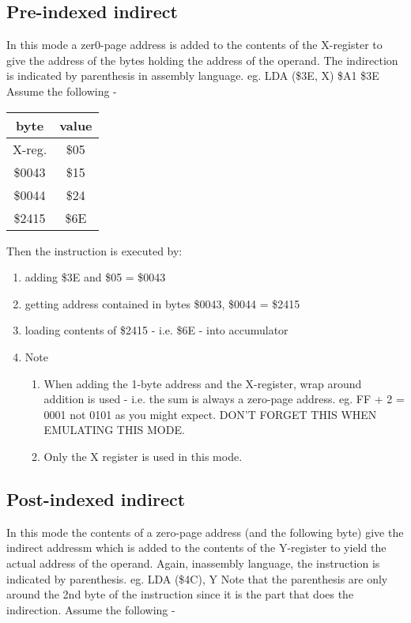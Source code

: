 \documentclass{article}
\begin{document}
  \subsection{Pre-indexed indirect}
  In this mode a zer0-page address is added to the contents of the X-register
  to give the address of the bytes holding the address of the operand. The
  indirection is indicated by parenthesis in assembly language.
  eg.  LDA (\$3E, X)
       \$A1 \$3E
  Assume the following -

  \begin{table}[h!]
  \centering
  \begin{tabular}{|c c|}
  \hline        
  byte   &  value \\
  \hline
  X-reg.  & \$05 \\
  \$0043  &  \$15 \\
  \$0044  &  \$24 \\
  \$2415  &  \$6E \\
  \hline
  \end{tabular}
  \end{table}

  Then the instruction is executed by:
  \begin{enumerate}
  \item   adding \$3E and \$05 = \$0043
  \item  getting address contained in bytes \$0043, \$0044 = \$2415
  \item loading contents of \$2415 - i.e. \$6E - into accumulator

  \item Note
  \begin{enumerate} 
  \item When adding the 1-byte address and the X-register, wrap around
        addition is used - i.e. the sum is always a zero-page address.
        eg. FF + 2 = 0001 not 0101 as you might expect.
        DON'T FORGET THIS WHEN EMULATING THIS MODE.
  \item Only the X register is used in this mode.
  \end{enumerate}
  \end{enumerate}

  \subsection{Post-indexed indirect}
  In this mode the contents of a zero-page address (and the following byte)
  give the indirect addressm which is added to the contents of the Y-register
  to yield the actual address of the operand. Again, inassembly language,
  the instruction is indicated by parenthesis.
  eg.  LDA (\$4C), Y
  Note that the parenthesis are only around the 2nd byte of the instruction
  since it is the part that does the indirection.
  Assume the following -
\end{document}
